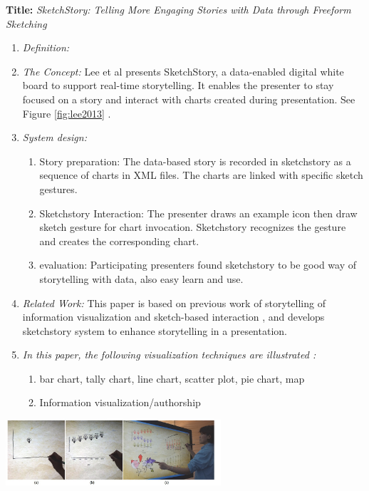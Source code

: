 \documentclass{egpubl}
\begin{document}
\textbf{Title:} \textit{SketchStory: Telling More Engaging Stories with Data through Freeform Sketching}
\begin{enumerate}
\item \textit{Definition:} 

\item \textit{The Concept:} Lee et al presents SketchStory, a data-enabled digital white board to support real-time storytelling. It enables the presenter to stay focused on a story and interact with charts created during presentation. See Figure \ref{fig:lee2013} \cite{lee2013}.
\item \textit{System design:}
\begin{enumerate}
\item Story preparation: The data-based story is recorded in sketchstory as a sequence of charts in XML files. The charts are linked with specific sketch gestures.
\item Sketchstory Interaction: The presenter draws an example icon then draw sketch gesture for chart invocation. Sketchstory recognizes the gesture and creates the corresponding chart.
\item evaluation: Participating presenters found sketchstory to be good way of storytelling with data, also easy learn and use.
\end{enumerate}
\item \textit{Related Work:}  This paper is based on previous work of storytelling of information visualization \cite{Gershon2,segal} and sketch-based interaction \cite{li2012}, and develops sketchstory system to enhance storytelling in a presentation.
\item \textit{In this paper, the following visualization techniques are illustrated :} 
\begin{enumerate}
\item bar chart, tally chart, line chart, scatter plot, pie chart, map
\item Information visualization/authorship
\end{enumerate}
\end{enumerate}
\begingroup
\centering
\includegraphics[width=8cm]{./images/lee2013}
\label{fig:lee2013}
\endgroup
\end{document}
